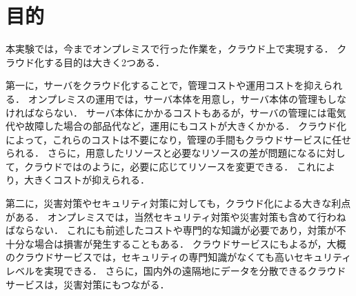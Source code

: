 \section{目的}
本実験では，今までオンプレミスで行った作業を，クラウド上で実現する．
クラウド化する目的は大きく2つある．\par
第一に，サーバをクラウド化することで，管理コストや運用コストを抑えられる．
オンプレミスの運用では，サーバ本体を用意し，サーバ本体の管理もしなければならない．
サーバ本体にかかるコストもあるが，サーバの管理には電気代や故障した場合の部品代など，運用にもコストが大きくかかる．
クラウド化によって，これらのコストは不要になり，管理の手間もクラウドサービスに任せられる．
さらに，用意したリソースと必要なリソースの差が問題になるに対して，クラウドではのように，必要に応じてリソースを変更できる．
これにより，大きくコストが抑えられる\cite{2015amazon}．\par
第二に，災害対策やセキュリティ対策に対しても，クラウド化による大きな利点がある．
オンプレミスでは，当然セキュリティ対策や災害対策も含めて行わねばならない．
これにも前述したコストや専門的な知識が必要であり，対策が不十分な場合は損害が発生することもある．
クラウドサービスにもよるが，大概のクラウドサービスでは，セキュリティの専門知識がなくても高いセキュリティレベルを実現できる．
さらに，国内外の遠隔地にデータを分散できるクラウドサービスは，災害対策にもつながる．\par
